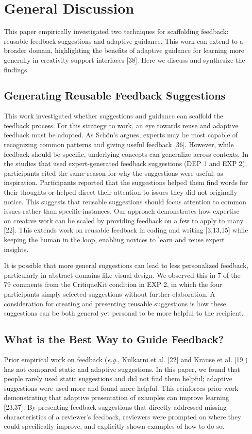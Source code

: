 \section{General Discussion}
This paper empirically investigated two techniques for scaffolding feedback: reusable feedback suggestions and adaptive guidance. This work can extend to a broader domain, highlighting the benefits of adaptive guidance for learning more generally in creativity support interfaces [38]. Here we discuss and synthesize the findings.  

\subsection{Generating Reusable Feedback Suggestions}
This work investigated whether suggestions and guidance can scaffold the feedback process. For this strategy to work, an eye towards reuse and adaptive feedback must be adopted. As Schön's argues, experts may be most capable of recognizing common patterns and giving useful feedback [36]. However, while feedback should be specific, underlying concepts can generalize across contexts. In the studies that used expert-generated feedback suggestions (DEP 1 and EXP 2), participants cited the same reason for why the suggestions were useful: as inspiration. Participants reported that the suggestions helped them find words for their thoughts or helped direct their attention to issues they did not originally notice. This suggests that reusable suggestions should focus attention to common issues rather than specific instances. Our approach demonstrates how expertise on creative work can be scaled by providing feedback on a few to apply to many [22]. This extends work on reusable feedback in coding and writing [3,13,15] while keeping the human in the loop, enabling novices to learn and reuse expert insights. 

It is possible that more general suggestions can lead to less personalized feedback, particularly in abstract domains like visual design. We observed this in 7 of the 79 comments from the CritiqueKit condition in EXP 2, in which the four participants simply selected suggestions without further elaboration. A consideration for creating and presenting reusable suggestions is how these suggestions can be both general yet personal to be more helpful to the recipient. 

\subsection{What is the Best Way to Guide Feedback?}
Prior empirical work on feedback (\textit{e.g.}, Kulkarni et al. [22] and Krause et al. [19]) has not compared static and adaptive suggestions. In this paper, we found that people rarely used static suggestions and did not find them helpful; adaptive suggestions were used more and found more helpful. This reinforces prior work demonstrating that adaptive presentation of examples can improve learning [23,37]. By presenting feedback suggestions that directly addressed missing characteristics of a reviewer's feedback, reviewers were prompted on where they could specifically improve, and explicitly shown examples of how to do so. 

